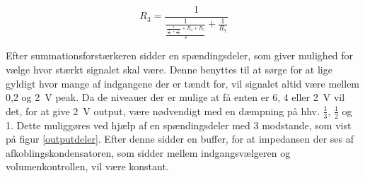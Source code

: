 \begin{equation}
\label{eq:indgangr3}
R_3 = \frac{1}{\frac{1}{\frac{\frac{1}{\frac{1}{R_1}+\frac{1}{R_2}}+R_4+R_5}{3}}+\frac{1}{R_7}}
\end{equation}

Efter summationsforstærkeren sidder en spændingsdeler, som giver mulighed for vælge hvor stærkt signalet skal være. Denne benyttes til  at sørge for at lige gyldigt hvor mange af indgangene der er tændt for, vil signalet altid være mellem 0,2 og 2~V peak. Da de niveauer der er mulige at få enten er 6, 4 eller 2~V vil det, for at give 2~V output, være nødvendigt med en dæmpning på hhv. $\frac{1}{3}$, $\frac{1}{2}$ og 1. Dette muliggøres ved hjælp af en spændingsdeler med 3 modstande, som vist på figur \ref{outputdeler}. Efter denne sidder en buffer, for at impedansen der ses af afkoblingskondensatoren, som sidder mellem indgangsvælgeren og volumenkontrollen, vil være konstant.
